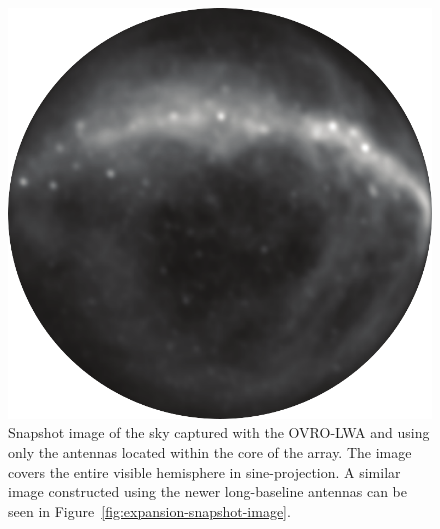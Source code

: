 \begin{bibunit}
\begin{figure}[t]
    \centering
    \includegraphics[width=\textwidth]{figures/chapter2/before-expansion}
    \caption{
        Snapshot image of the sky captured with the OVRO-LWA and using only the antennas located
        within the core of the array. The image covers the entire visible hemisphere in
        sine-projection.  A similar image constructed using the newer long-baseline antennas can be
        seen in Figure~\ref{fig:expansion-snapshot-image}.
    }
    \label{fig:core-snapshot-image}
\end{figure}


\end{bibunit}
